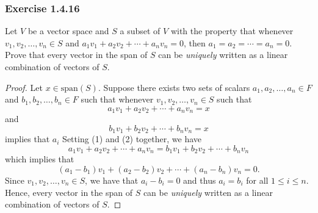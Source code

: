 \subsubsection{Exercise 1.4.16} Let \( V  \) be a vector space and \( S  \) a subset of \( V  \) with the property that whenever \( v_{1}, v_{2}, \dots, v_{n} \in S  \) and \( a_{1} v_{1} + a_{2} v_{2} + \cdots + a_{n} v_{n} = 0  \), then \( a_{1} = a_{2} = \cdots = a_{n} = 0  \). Prove that every vector in the span  of \( S  \) can be \textit{uniquely}  written as a linear combination of vectors of \( S  \).
\begin{proof}
     Let \( x \in \text{span}(S) \). Suppose there exists two sets of scalars \( a_{1}, a_{2} , \dots, a_{n} \in F  \) and \( b_{1}, b_{2}, \dots, b_{n} \in F  \) such that whenever \( v_{1}, v_{2}, \dots, v_{n} \in S  \) such that 
     \[  a_{1} v_{1} + a_{2} v_{2} + \cdots + a_{n} v_{n} = x \tag{1}  \] and 
     \[  b_{1} v_{1} + b_{2} v_{2} + \cdots + b_{n} v_{n} = x \tag{2}  \]
     implies that \( a_{i}  \)
     Setting (1) and (2) together, we have 
     \[   a_{1} v_{1} + a_{2} v_{2} + \cdots + a_{n} v_{n} = b_{1} v_{1} + b_{2} v_{2} + \cdots + b_{n} v_{n} \tag{3}  \]
     which implies that 
     \[ (a_{1} - b_{1}) v_{1} + (a_{2} - b_{2})v_{2} + \cdots + (a_{n} - b_{n} ) v_{n} = 0.  \]
     Since \( v_{1}, v_{2}, \dots, v_{n} \in S   \), we have that  \( a_{i} - b_{i} = 0   \) and thus \( a_{i} = b_{i} \) for all \( 1 \leq i \leq n  \). Hence, every vector in the span of \( S  \) can be \textit{uniquely} written as a linear combination of vectors of \( S  \). 
 \end{proof}




